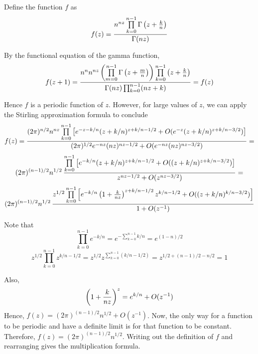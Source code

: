 \documentclass[12pt]{article}
\begin{document}
Define the function $f$ as
 $$f(z) = {n^{nz} \prod\limits_{k=0}^{n-1}
 \Gamma \left( z + {k \over n} \right) \over \Gamma (nz)}$$

By the functional equation of the gamma function,
 $$f(z+1) = {n^n n^{nz} \left( \prod\limits_{m=0}^{n-1}
 \Gamma \left (z + {m \over n} \right) \right) \prod\limits_{k=0}^{n-1}
 \left( z + {k \over n} \right) \over \Gamma (nz) \prod_{k=0}^{n-1} (nz + k) } = f(z)$$

Hence $f$ is a periodic function of $z$.  However, for large values
of $z$, we can apply the Stirling approximation formula to conclude
 $$f(z) = {(2 \pi)^{n/2} n^{nz} \prod\limits_{k=0}^{n-1} \left[ e^{-z-k/n}
  (z + k/n)^{z + k/n - 1/2} + O(e^{-z} (z+ k/n)^{z + k/n - 3/2}) \right] \over (2 \pi)^{1/2}
   e^{-nz} (nz)^{nz - 1/2} + O(e^{-nz} (nz)^{nz - 3/2}) } = $$
$$(2 \pi)^{(n-1)/2} n^{1/2} \, {\prod\limits_{k=0}^{n-1} \left[ e^{-k/n}
  (z + k/n)^{z + k/n - 1/2} + O((z+ k/n)^{z + k/n - 3/2}) \right] \over
  z^{nz - 1/2} + O(z^{nz - 3/2}) } = $$
$$(2 \pi)^{(n-1)/2} n^{1/2} \, {z^{1/2} \prod\limits_{k=0}^{n-1} \left[ e^{-k/n}
  \left( 1 + {k \over nz} \right)^{z + k/n - 1/2} z^{k/n - 1/2} + O((z+ k/n)^{k/n - 3/2}) \right] \over
  1 + O(z^{- 1}) }$$

Note that
 $$\prod\limits_{k=0}^{n-1} e^{-k/n} = e^{- \sum_{k=0}^{n-1}
k/n} = e^{(1-n)/2}$$
 $$z^{1/2} \prod\limits_{k=0}^{n-1} z^{k/n - 1/2} = z^{1/2} z^{\sum_{k=0}^{n-1}
(k/n - 1/2)} = z^{1/2 + (n-1)/2 - n/2} = 1$$

Also,
 $$\left( 1 + {k \over nz} \right)^z = e^{k/n} + O(z^{-1})$$
Hence, $f(z) = (2 \pi)^{(n-1)/2} n^{1/2} + O(z^{- 1})$.  Now, the only way for a function to be periodic and have a definite limit is for that function to be constant.  Therefore, $f(z) = (2 \pi)^{(n-1)/2} n^{1/2}$.  Writing out the definition of $f$ and rearranging gives the multiplication formula.
\end{document}
